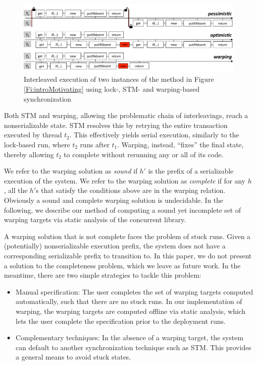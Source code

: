 \begin{figure}
	\begin{center}
	\includegraphics[width=\textwidth]{OverviewSlide.pdf}
	\end{center}
	\caption{\label{Fi:motivatingOverview}Interleaved execution of two instances of the method in Figure \ref{Fi:introMotivating} using lock-, STM- and warping-based synchronization}
\end{figure}

Both STM and warping, allowing the problematic chain of interleavings, reach a nonserializable state. STM resolves this by retrying the entire transaction executed by thread $t_2$. This effectively yields serial execution, similarly to the lock-based run, where $t_2$ runs after $t_1$. Warping, instead, ``fixes'' the final state, thereby allowing $t_2$ to complete without rerunning any or all of its code.

We refer to the warping solution as \emph{sound} if $h'$ is the prefix of a serializable execution of the system. We refer to the warping solution as \emph{complete} if for any $h$, all the $h'$s that satisfy the conditions above are in the warping relation. Obviously a sound and complete warping solution is undecidable. In the following, we describe our method of computing a sound yet incomplete set of warping targets via static analysis of the concurrent library.

A warping solution that is not complete faces the problem of stuck runs. Given a (potentially) nonserializable execution prefix, the system does not have a corresponding serializable prefix to transition to. In this paper, we do not present a solution to the completeness problem, which we leave as future work. In the meantime, there are two simple strategies to tackle this problem:
\begin{itemize}
	\item Manual specification: The user completes the set of warping targets computed automatically, such that there are no stuck runs. In our implementation of warping, the warping targets are computed offline via static analysis, which lets the user complete the specification prior to the deployment runs.
	\item Complementary techniques: In the absence of a warping target, the system can default to another synchronization technique such as STM. This provides a general means to avoid stuck states.
\end{itemize}


